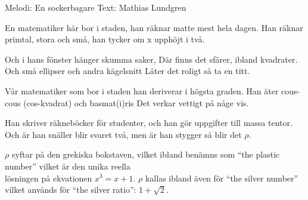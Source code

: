 \begin{song}

\begin{songmeta}
Melodi: En sockerbagare
Text: Mathias Lundgren
\end{songmeta}

\begin{songtext}
En matematiker här bor i staden,
han räknar matte mest hela dagen.
Han räknar primtal, stora och små,
han tycker om x upphöjt i två.

Och i hans fönster hänger skumma saker,
Där finns det sfärer, ibland kvadrater.
Och små ellipser och andra kägelsnitt
Låter det roligt så ta en titt.

Vår matematiker som bor i staden
han deriverar i högsta graden.
Han äter cous-cous (cos-kvadrat) och basmat(i)ris
Det verkar vettigt på någe vis.

Han skriver räkneböcker för studenter,
och han gör uppgifter till massa tentor.
Och är han snäller blir svaret två,
men är han stygger så blir det \begin{math}\rho\end{math}.
\end{songtext}

\begin{songnotes}
\begin{math}\rho\end{math} syftar på den grekiska bokstaven, vilket ibland
benämns som \textquotedblleft{}the plastic number\textquotedblright{} vilket är
den unika reella \\ lösningen på ekvationen $x^3 = x + 1$.
\begin{math}\rho\end{math} kallas ibland även för \textquotedblleft{}the silver
number\textquotedblright{} vilket används för \textquotedblleft{}the silver
ratio\textquotedblright{}: $1 + \sqrt{2}$.
\end{songnotes}
\end{song}
